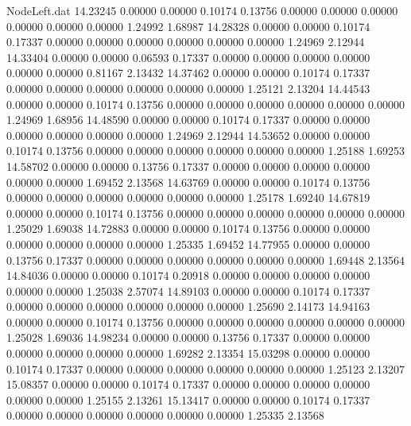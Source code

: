 \begin{filecontents}{NodeLeft.dat}
  14.23245    0.00000    0.00000     0.10174    0.13756    0.00000    0.00000    0.00000    0.00000    0.00000    0.00000    1.24992    1.68987
  14.28328    0.00000    0.00000     0.10174    0.17337    0.00000    0.00000    0.00000    0.00000    0.00000    0.00000    1.24969    2.12944
  14.33404    0.00000    0.00000     0.06593    0.17337    0.00000    0.00000    0.00000    0.00000    0.00000    0.00000    0.81167    2.13432
  14.37462    0.00000    0.00000     0.10174    0.17337    0.00000    0.00000    0.00000    0.00000    0.00000    0.00000    1.25121    2.13204
  14.44543    0.00000    0.00000     0.10174    0.13756    0.00000    0.00000    0.00000    0.00000    0.00000    0.00000    1.24969    1.68956
  14.48590    0.00000    0.00000     0.10174    0.17337    0.00000    0.00000    0.00000    0.00000    0.00000    0.00000    1.24969    2.12944
  14.53652    0.00000    0.00000     0.10174    0.13756    0.00000    0.00000    0.00000    0.00000    0.00000    0.00000    1.25188    1.69253
  14.58702    0.00000    0.00000     0.13756    0.17337    0.00000    0.00000    0.00000    0.00000    0.00000    0.00000    1.69452    2.13568
  14.63769    0.00000    0.00000     0.10174    0.13756    0.00000    0.00000    0.00000    0.00000    0.00000    0.00000    1.25178    1.69240
  14.67819    0.00000    0.00000     0.10174    0.13756    0.00000    0.00000    0.00000    0.00000    0.00000    0.00000    1.25029    1.69038
  14.72883    0.00000    0.00000     0.10174    0.13756    0.00000    0.00000    0.00000    0.00000    0.00000    0.00000    1.25335    1.69452
  14.77955    0.00000    0.00000     0.13756    0.17337    0.00000    0.00000    0.00000    0.00000    0.00000    0.00000    1.69448    2.13564
  14.84036    0.00000    0.00000     0.10174    0.20918    0.00000    0.00000    0.00000    0.00000    0.00000    0.00000    1.25038    2.57074
  14.89103    0.00000    0.00000     0.10174    0.17337    0.00000    0.00000    0.00000    0.00000    0.00000    0.00000    1.25690    2.14173
  14.94163    0.00000    0.00000     0.10174    0.13756    0.00000    0.00000    0.00000    0.00000    0.00000    0.00000    1.25028    1.69036
  14.98234    0.00000    0.00000     0.13756    0.17337    0.00000    0.00000    0.00000    0.00000    0.00000    0.00000    1.69282    2.13354
  15.03298    0.00000    0.00000     0.10174    0.17337    0.00000    0.00000    0.00000    0.00000    0.00000    0.00000    1.25123    2.13207
  15.08357    0.00000    0.00000     0.10174    0.17337    0.00000    0.00000    0.00000    0.00000    0.00000    0.00000    1.25155    2.13261
  15.13417    0.00000    0.00000     0.10174    0.17337    0.00000    0.00000    0.00000    0.00000    0.00000    0.00000    1.25335    2.13568

\end{filecontents}

